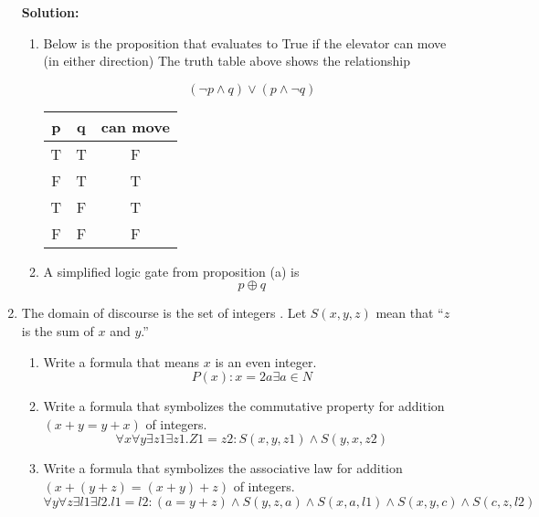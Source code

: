 \documentclass[12pt]{article}
\begin{document}
\begin{enumerate}
        \textbf{Solution: }
        \begin{enumerate}
            \item Below is the proposition that evaluates to True if the elevator can move (in either direction)
                The truth table above shows the relationship

                \[ (\neg p \wedge q) \vee (p \wedge \neg q) \]

                \begin{table}[h]
                    \centering
                    \begin{tabular}{| c | c | c|}
                        \hline
                        p & q & can move \\ \hline
                        T & T & F \\ 
                        F & T & T \\ 
                        T & F & T \\ 
                        F & F & F \\ \hline
                    \end{tabular}
                \end{table}

                \item A simplified logic gate from proposition (a) is
                    \[ p \oplus q \]
        \end{enumerate}

    \item The domain of discourse is the set of integers . Let $S(x, y, z)$ mean that ``$z$ is the sum of $x$ and $y$.''
        \begin{enumerate}
            \item Write a formula that means $x$ is an even integer.\\
                \[ P(x):  x = 2a   \exists a \in N \]

            \item Write a formula that symbolizes the commutative property for addition $(x+y = y +x)$ of integers.
                \[ \forall x \forall y \exists z1 \exists z1. Z1 = z2  : S(x,y,z1) \wedge S(y,x,z2) \]

            \item Write a formula that symbolizes the associative law for addition\\ $(x + (y + z) = (x + y) + z)$ of integers.
                \[ \forall y \forall z \exists l1 \exists l2 . l1 = l2 : (a = y + z) \wedge S(y,z, a) \wedge S (x, a, l1) \wedge S(x,y, c) \wedge S(c,z, l2) \]
        \end{enumerate}


\end{enumerate}
\end{document}
